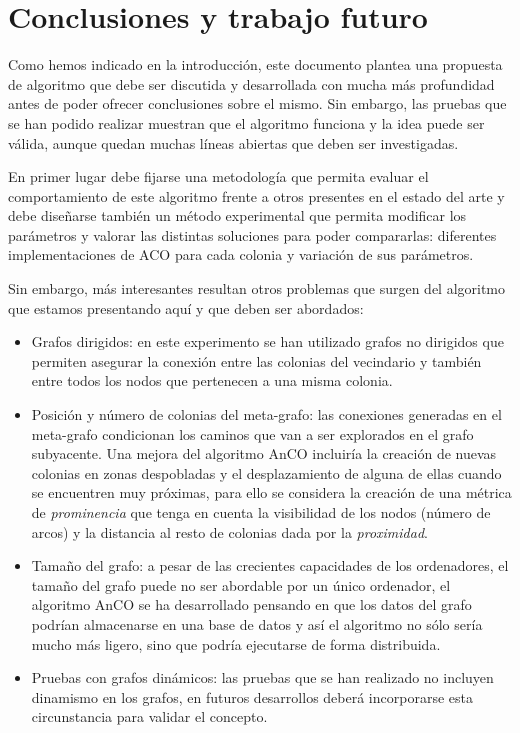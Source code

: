 \documentclass{llncs}
\begin{document}
\section{Conclusiones y trabajo futuro}
Como hemos indicado en la introducci{\'o}n, este documento plantea una propuesta de algoritmo que debe ser discutida y desarrollada con mucha m{\'a}s profundidad antes de poder ofrecer conclusiones sobre el mismo.
Sin embargo, las pruebas que se han podido realizar muestran que el algoritmo funciona y la idea puede ser v{\'a}lida, aunque quedan muchas l{\'i}neas abiertas que deben ser investigadas.

En primer lugar debe fijarse una metodolog{\'i}a que permita evaluar el comportamiento de este algoritmo frente a otros presentes en el estado del arte y debe dise\~{n}arse tambi{\'e}n un m{\'e}todo experimental que permita modificar los par{\'a}metros y valorar las distintas soluciones para poder compararlas: diferentes implementaciones de ACO para cada colonia y variaci{\'o}n de sus par{\'a}metros.

Sin embargo, m{\'a}s interesantes resultan otros problemas que surgen del algoritmo que estamos presentando aqu{\'i} y que deben ser abordados:
\begin{itemize}
  \item Grafos dirigidos: en este experimento se han utilizado grafos no dirigidos que permiten asegurar la conexi{\'o}n entre las colonias del vecindario y tambi{\'e}n entre todos los nodos que pertenecen a una misma colonia.
  \item Posici{\'o}n y n{\'u}mero de colonias del meta-grafo: las conexiones generadas en el meta-grafo condicionan los caminos que van a ser explorados en el grafo subyacente. Una mejora del algoritmo AnCO incluir{\'i}a la creaci{\'o}n de nuevas colonias en zonas despobladas y el desplazamiento de alguna de ellas cuando se encuentren muy pr{\'o}ximas, para ello se considera la creaci{\'o}n de una m{\'e}trica de \textit{prominencia} que tenga en cuenta la visibilidad de los nodos (n{\'u}mero de arcos) y la distancia al resto de colonias dada por la \textit{proximidad}.
  \item Tama\~{n}o del grafo: a pesar de las crecientes capacidades de los ordenadores, el tama\~{n}o del grafo puede no ser abordable por un {\'u}nico ordenador, el algoritmo AnCO se ha desarrollado pensando en que los datos del grafo podr{\'i}an almacenarse en una base de datos \cite{Rivero2011} y as{\'i} el algoritmo no s{\'o}lo ser{\'i}a mucho m{\'a}s ligero, sino que podr{\'i}a ejecutarse de forma distribuida.
  \item Pruebas con grafos din{\'a}micos: las pruebas que se han realizado no incluyen dinamismo en los grafos, en futuros desarrollos deber{\'a} incorporarse esta circunstancia para validar el concepto.
\end{itemize}
\end{document}
